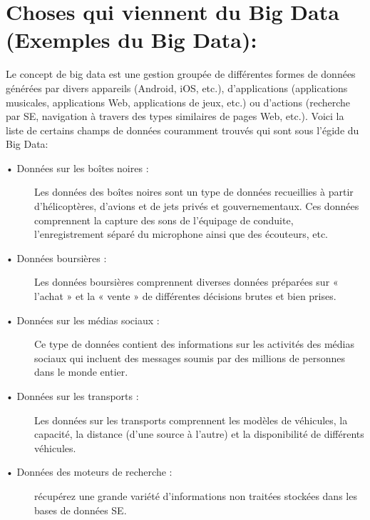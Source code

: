 \section{Choses qui viennent du Big Data (Exemples du Big Data):}
Le concept de big data est une gestion groupée de différentes formes de données générées par divers appareils (Android, iOS, etc.), d’applications (applications musicales, applications Web, applications de jeux, etc.) ou d’actions (recherche par SE, navigation à travers des types similaires de pages Web, etc.). Voici la liste de certains champs de données couramment trouvés qui sont sous l’égide du Big Data:

\begin{description}
\item[•	Données sur les boîtes noires :]
Les données des boîtes noires sont un type de données recueillies à partir d’hélicoptères, d’avions et de jets privés et gouvernementaux. Ces données comprennent la capture des sons de l’équipage de conduite, l’enregistrement séparé du microphone ainsi que des écouteurs, etc.
\item[•	Données boursières :]
Les données boursières comprennent diverses données préparées sur « l’achat » et la « vente » de différentes décisions brutes et bien prises.
\item[•	Données sur les médias sociaux :] 
Ce type de données contient des informations sur les activités des médias sociaux qui incluent des messages soumis par des millions de personnes dans le monde entier.
\item[•	Données sur les transports :] 
Les données sur les transports comprennent les modèles de véhicules, la capacité, la distance (d’une source à l’autre) et la disponibilité de différents véhicules.
\item[•	Données des moteurs de recherche :] 
récupérez une grande variété d’informations non traitées stockées dans les bases de données SE.

\end{description}